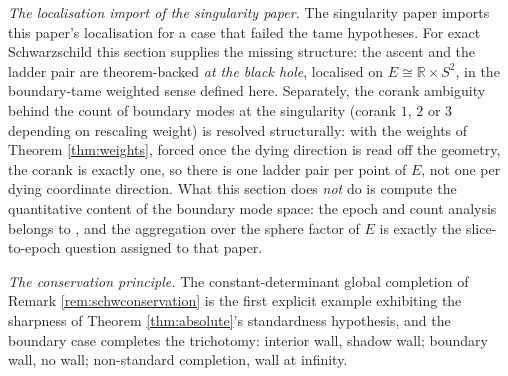 \documentclass[11pt]{article}
\theoremstyle{definition}
\newcommand{\R}{\mathbb{R}}
\begin{document}
\emph{The localisation import of the singularity paper.} The singularity paper \cite{ButlerT5} imports this paper's localisation for a case that failed the tame hypotheses. For exact Schwarzschild this section supplies the missing structure: the ascent and the ladder pair are theorem-backed \emph{at the black hole}, localised on $E \cong \R \times S^2$, in the boundary-tame weighted sense defined here. Separately, the corank ambiguity behind the count of boundary modes at the singularity (corank $1$, $2$ or $3$ depending on rescaling weight) is resolved structurally: with the weights of Theorem \ref{thm:weights}, forced once the dying direction is read off the geometry, the corank is exactly one, so there is one ladder pair per point of $E$, not one per dying coordinate direction. What this section does \emph{not} do is compute the quantitative content of the boundary mode space: the epoch and count analysis belongs to \cite{ButlerT8}, and the aggregation over the sphere factor of $E$ is exactly the slice-to-epoch question assigned to that paper.

\emph{The conservation principle.} The constant-determinant global completion of Remark \ref{rem:schwconservation} is the first explicit example exhibiting the sharpness of Theorem \ref{thm:absolute}'s standardness hypothesis, and the boundary case completes the trichotomy: interior wall, shadow wall; boundary wall, no wall; non-standard completion, wall at infinity.
\end{document}
